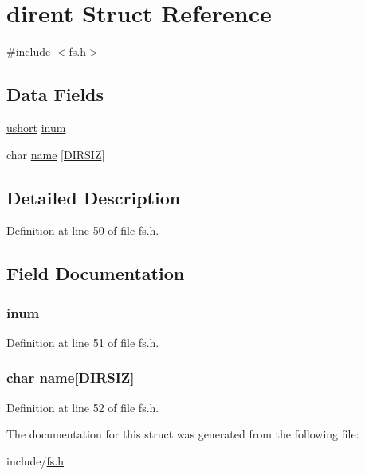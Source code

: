 \hypertarget{structdirent}{\section{dirent Struct Reference}
\label{structdirent}
}


{\ttfamily \#include $<$fs.\-h$>$}

\subsection*{Data Fields}
\begin{DoxyCompactItemize}
\item 
\hyperlink{types_8h_ab95f123a6c9bcfee6a343170ef8c5f69}{ushort} \hyperlink{structdirent_a2cc9c25712babfd70a85bb0dac70dcf1}{inum}
\item 
char \hyperlink{structdirent_a8ccdb14ce534c8ad0b98a76b02dcdb76}{name} \mbox{[}\hyperlink{fs_8h_a48246fb9e5cb7f6a71ebc9ebc2f06562}{D\-I\-R\-S\-I\-Z}\mbox{]}
\end{DoxyCompactItemize}


\subsection{Detailed Description}


Definition at line 50 of file fs.\-h.



\subsection{Field Documentation}
\hypertarget{structdirent_a2cc9c25712babfd70a85bb0dac70dcf1}{
\subsubsection[{inum}]{ inum}}\label{structdirent_a2cc9c25712babfd70a85bb0dac70dcf1}


Definition at line 51 of file fs.\-h.

\hypertarget{structdirent_a8ccdb14ce534c8ad0b98a76b02dcdb76}{
\subsubsection[{name}]{\setlength{\rightskip}{0pt plus 5cm}char name\mbox{[}{\bf D\-I\-R\-S\-I\-Z}\mbox{]}}}\label{structdirent_a8ccdb14ce534c8ad0b98a76b02dcdb76}


Definition at line 52 of file fs.\-h.



The documentation for this struct was generated from the following file\-:\begin{DoxyCompactItemize}
\item 
include/\hyperlink{fs_8h}{fs.\-h}\end{DoxyCompactItemize}
